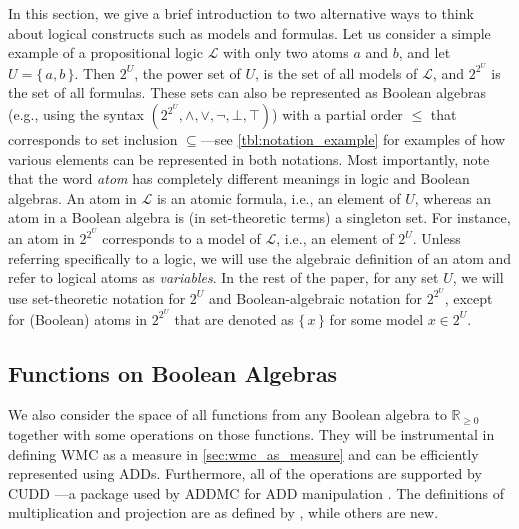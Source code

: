 In this section, we give a brief introduction to two alternative ways to think
about logical constructs such as models and formulas. Let us consider a simple
example of a propositional logic $\mathcal{L}$ with only two atoms $a$ and $b$,
and let $U = \{\, a, b \,\}$. Then $2^U$, the power set of $U$, is the set of
all models of $\mathcal{L}$, and $2^{2^U}$ is the set of all formulas. These
sets can also be represented as Boolean algebras (e.g., using the syntax
$(2^{2^U}, \land, \lor, \neg, \bot, \top)$) with a partial order $\le$ that
corresponds to set inclusion $\subseteq$---see \cref{tbl:notation_example} for
examples of how various elements can be represented in both notations. Most
importantly, note that the word \emph{atom} has completely different meanings in
logic and Boolean algebras. An atom in $\mathcal{L}$ is an atomic formula, i.e.,
an element of $U$, whereas an atom in a Boolean algebra is (in set-theoretic
terms) a singleton set. For instance, an atom in $2^{2^U}$ corresponds to a
model of $\mathcal{L}$, i.e., an element of $2^U$. Unless referring specifically
to a logic, we will use the algebraic definition of an atom and refer to logical
atoms as \emph{variables}. In the rest of the paper, for any set $U$, we will
use set-theoretic notation for $2^U$ and Boolean-algebraic notation for
$2^{2^U}$, except for (Boolean) atoms in $2^{2^U}$ that are denoted as
$\{\, x \,\}$ for some model $x \in 2^U$.

\subsection{Functions on Boolean Algebras}

We also consider the space of all functions from any Boolean algebra to
$\mathbb{R}_{\ge 0}$ together with some operations on those functions. They will
be instrumental in defining WMC as a measure in \cref{sec:wmc_as_measure} and
can be efficiently represented using ADDs. Furthermore, all of the operations
are supported by CUDD \citep{somenzi1998cudd}---a package used by \textsc{ADDMC}
for ADD manipulation \citep{DBLP:conf/aaai/DudekPV20}. The definitions of
multiplication and projection are as defined by
\citet{DBLP:conf/aaai/DudekPV20}, while others are new.

